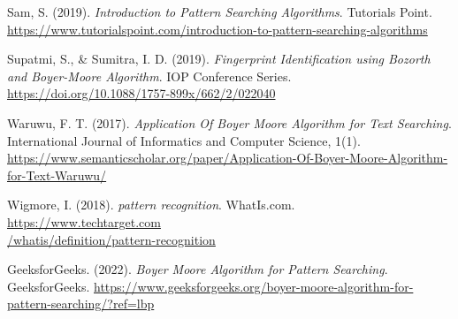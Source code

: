 \begin{thebibliography}{21}
    Sam, S. (2019). \emph{Introduction to Pattern Searching Algorithms}. Tutorials Point.
    \href{https://www.tutorialspoint.com/introduction-to-pattern-searching-algorithms#:~:text=Pattern\%20Searching\%20algorithms\%20are\%20used,task\%20for\%20a\%20longer\%20text}{https://www.tutorialspoint.com/introduction-to-pattern-searching-algorithms}

    Supatmi, S., \& Sumitra, I. D. (2019). \emph{Fingerprint Identification using Bozorth and
    Boyer-Moore Algorithm}. IOP Conference Series.
    \href{https://doi.org/10.1088/1757-899x/662/2/022040}{https://doi.org/10.1088/1757-899x/662/2/022040}

    Waruwu, F. T. (2017). \emph{Application Of Boyer Moore Algorithm for Text Searching}.
    International Journal of Informatics and Computer Science, 1(1).
    \href{https://www.semanticscholar.org/paper/Application-Of-Boyer-Moore-Algorithm-for-Text-Waruwu/423dcabcd3c5a5e5187f33726114d98e51c14a5c}{https://www.semanticscholar.org/paper/Application-Of-Boyer-Moore-Algorithm-for-Text-Waruwu/}

    Wigmore, I. (2018). \emph{pattern recognition}. WhatIs.com.
    \href{https://www.techtarget.com/whatis/definition/pattern-recognition}{https://www.techtarget.com\\/whatis/definition/pattern-recognition}

    GeeksforGeeks. (2022). \emph{Boyer Moore Algorithm for Pattern Searching}. GeeksforGeeks.
    \href{https://www.geeksforgeeks.org/boyer-moore-algorithm-for-pattern-searching/?ref=lbp}{https://www.geeksforgeeks.org/boyer-moore-algorithm-for-pattern-searching/?ref=lbp}

\end{thebibliography}
